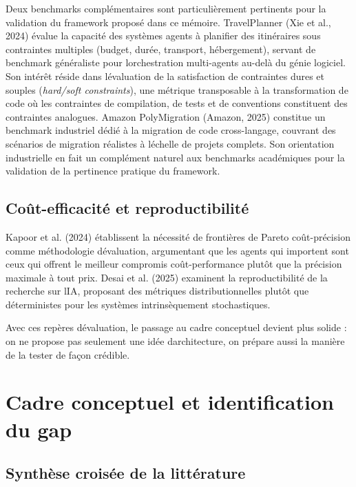 \documentclass[12pt,a4paper]{article}
\begin{document}
Deux benchmarks complémentaires sont particulièrement pertinents pour
la validation du framework proposé dans ce mémoire. TravelPlanner
(Xie et al., 2024) évalue la capacité des systèmes agents à planifier
des itinéraires sous contraintes multiples (budget, durée, transport,
hébergement), servant de benchmark généraliste pour
l\textquotesingle orchestration multi-agents au-delà du génie logiciel.
Son intérêt réside dans l\textquotesingle évaluation de la satisfaction
de contraintes dures et souples (\emph{hard/soft constraints}), une
métrique transposable à la transformation de code où les contraintes
de compilation, de tests et de conventions constituent des contraintes
analogues. Amazon PolyMigration (Amazon, 2025) constitue un benchmark
industriel dédié à la migration de code cross-langage, couvrant des
scénarios de migration réalistes à l\textquotesingle échelle de
projets complets. Son orientation industrielle en fait un complément
naturel aux benchmarks académiques pour la validation de la pertinence
pratique du framework.

\subsection{Coût-efficacité et
reproductibilité}\label{couxfbt-efficacituxe9-et-reproductibilituxe9}

Kapoor et al. (2024) établissent la nécessité de frontières de Pareto
coût-précision comme méthodologie d\textquotesingle évaluation,
argumentant que les agents qui importent sont ceux qui offrent le
meilleur compromis coût-performance plutôt que la précision maximale à
tout prix. Desai et al. (2025) examinent la reproductibilité de la
recherche sur l\textquotesingle IA, proposant des métriques
distributionnelles plutôt que déterministes pour les systèmes
intrinsèquement stochastiques.

Avec ces repères d\textquotesingle évaluation, le passage au cadre
conceptuel devient plus solide : on ne propose pas seulement une idée
d\textquotesingle architecture, on prépare aussi la manière de la tester
de façon crédible.

\section{Cadre conceptuel et identification du
gap}\label{cadre-conceptuel-et-identification-du-gap}

\subsection{Synthèse croisée de la
littérature}\label{synthuxe8se-croisuxe9e-de-la-littuxe9rature}
\end{document}
